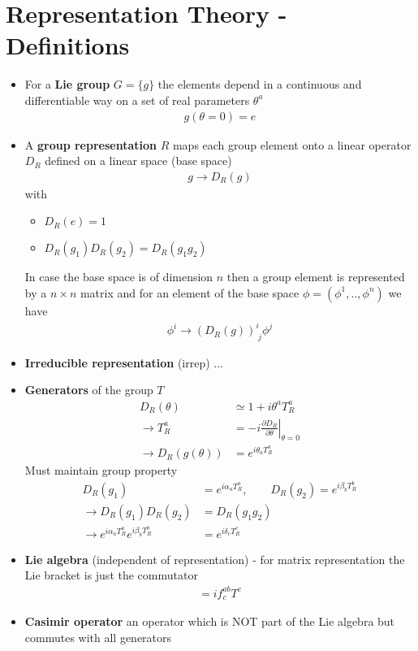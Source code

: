 \documentclass[10pt,a4paper]{report}
\theoremstyle{definition}
\begin{document}
\section{Representation Theory - Definitions}
\begin{itemize}
\item For a {\bf Lie group} $G=\{g\}$ the elements depend in a continuous and differentiable way on a set of real parameters $\theta^a$
\begin{align}
g(\theta=0)=e
\end{align}

\item A {\bf group representation} $R$ maps each group element onto a linear operator $D_R$ defined on a linear space (base space)
\begin{align}
g\rightarrow D_R(g)
\end{align}
with
\begin{itemize}
\item $D_R(e)=1$
\item $D_R(g_1)D_R(g_2)=D_R(g_1g_2)$
\end{itemize}
In case the base space is of dimension $n$ then a group element is represented by a $n\times n$ matrix and for an element of the base space $\phi=(\phi^1,..,\phi^n)$ we have
\begin{align}
\phi^i\rightarrow(D_R(g))^i_{\;j}\phi^j
\end{align}

\item {\bf Irreducible representation} (irrep) ...

\item {\bf Generators} of the group $T$
\begin{align}
D_R(\theta)&\simeq 1+i\theta^aT_R^a\\
\rightarrow T_R^a&=\left.-i\frac{\partial D_R}{\partial\theta}\right|_{\theta=0}\\
\rightarrow D_R(g(\theta))&=e^{i\theta_aT_R^a}
\end{align}
Must maintain group property
\begin{align}
D_R(g_1)&=e^{i\alpha_aT_R^a}, \qquad D_R(g_2)=e^{i\beta_bT_R^b}\\
\rightarrow D_R(g_1)D_R(g_2)&=D_R(g_1g_2)\\
\rightarrow e^{i\alpha_aT_R^a}e^{i\beta_bT_R^b}&=e^{i\delta_cT_R^c}
\end{align}

\item {\bf Lie algebra} (independent of representation) - for matrix representation the Lie bracket is just the commutator 
\begin{align}
[T^a,T^b]=if^{ab}_cT^c
\end{align}

\item {\bf Casimir operator} an operator which is NOT part of the Lie algebra but commutes with all generators

\end{itemize}
\end{document}
